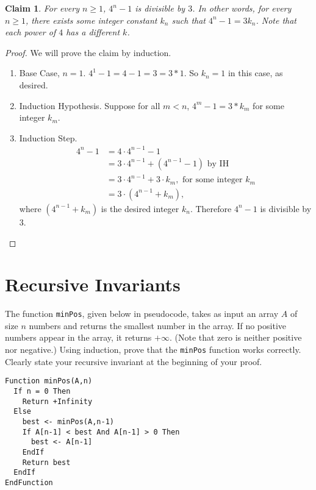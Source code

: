 \documentclass{article}
\newtheorem{claim}{Claim}
\begin{document}
    \begin{claim}
      For every $n \geq 1$, $4^n - 1$ is divisible by $3$.  In other words, for every $n \geq 1$, there exists some integer constant $k_n$ such that $4^n - 1 = 3k_n$.  Note that each power of $4$ has a different $k$.
    \end{claim}

    \begin{proof}
      We will prove the claim by induction. 
      \begin{enumerate}
        \item Base Case, $n=1$. $4^1-1 = 4-1 = 3 = 3*1$. So $k_n=1$ in this case, as desired. 
        \item Induction Hypothesis. Suppose for all $m<n$, $4^m-1 = 3*k_m$ for some integer $k_m$. 
        \item Induction Step.
        \begin{align*}
          4^n-1 &= 4\cdot 4^{n-1} -1\\
          &= 3\cdot 4^{n-1} + (4^{n-1}-1) \text{ by IH}\\
          &= 3\cdot 4^{n-1} + 3\cdot k_m, \text{ for some integer }k_m\\
          &= 3\cdot (4^{n-1}+k_m),
        \end{align*}
        where $(4^{n-1}+k_m)$ is the desired integer $k_n$. Therefore $4^n-1$ is divisible by $3$.
      \end{enumerate}
    \end{proof}


    \vspace{1cm}
    \section{Recursive Invariants}

    The function \texttt{minPos}, given below in pseudocode, takes as input an array $A$ of size $n$ numbers and returns the smallest  number in the array.  If no positive numbers appear in the array, it returns $+\infty$.  (Note that zero is neither positive nor negative.)  Using induction, prove that the \texttt{minPos} function works correctly.  Clearly state your recursive invariant at the beginning of your proof.

    \begin{verbatim}
Function minPos(A,n)
  If n = 0 Then
    Return +Infinity
  Else
    best <- minPos(A,n-1)
    If A[n-1] < best And A[n-1] > 0 Then
      best <- A[n-1]
    EndIf
    Return best
  EndIf
EndFunction
    \end{verbatim}
\end{document}
